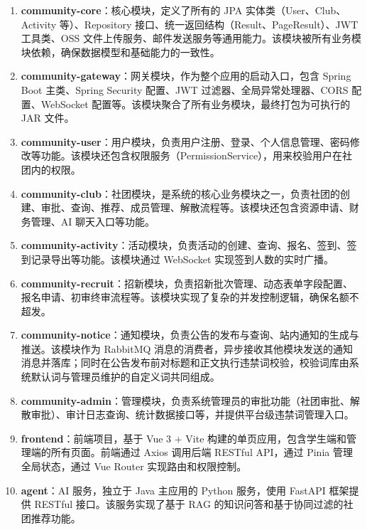\begin{enumerate}
  \item \textbf{community-core}：核心模块，定义了所有的 JPA 实体类（User、Club、Activity 等）、Repository 接口、统一返回结构（Result、PageResult）、JWT 工具类、OSS 文件上传服务、邮件发送服务等通用能力。该模块被所有业务模块依赖，确保数据模型和基础能力的一致性。

  \item \textbf{community-gateway}：网关模块，作为整个应用的启动入口，包含 Spring Boot 主类、Spring Security 配置、JWT 过滤器、全局异常处理器、CORS 配置、WebSocket 配置等。该模块聚合了所有业务模块，最终打包为可执行的 JAR 文件。

  \item \textbf{community-user}：用户模块，负责用户注册、登录、个人信息管理、密码修改等功能。该模块还包含权限服务（PermissionService），用来校验用户在社团内的权限。

  \item \textbf{community-club}：社团模块，是系统的核心业务模块之一，负责社团的创建、审批、查询、推荐、成员管理、解散流程等。该模块还包含资源申请、财务管理、AI 聊天入口等功能。

  \item \textbf{community-activity}：活动模块，负责活动的创建、查询、报名、签到、签到记录导出等功能。该模块通过 WebSocket 实现签到人数的实时广播。

  \item \textbf{community-recruit}：招新模块，负责招新批次管理、动态表单字段配置、报名申请、初审终审流程等。该模块实现了复杂的并发控制逻辑，确保名额不超发。

  \item \textbf{community-notice}：通知模块，负责公告的发布与查询、站内通知的生成与推送。该模块作为 RabbitMQ 消息的消费者，异步接收其他模块发送的通知消息并落库；同时在公告发布前对标题和正文执行违禁词校验，校验词库由系统默认词与管理员维护的自定义词共同组成。

  \item \textbf{community-admin}：管理模块，负责系统管理员的审批功能（社团审批、解散审批）、审计日志查询、统计数据接口等，并提供平台级违禁词管理入口。

  \item \textbf{frontend}：前端项目，基于 Vue 3 + Vite 构建的单页应用，包含学生端和管理端的所有页面。前端通过 Axios 调用后端 RESTful API，通过 Pinia 管理全局状态，通过 Vue Router 实现路由和权限控制。

  \item \textbf{agent}：AI 服务，独立于 Java 主应用的 Python 服务，使用 FastAPI 框架提供 RESTful 接口。该服务实现了基于 RAG 的知识问答和基于协同过滤的社团推荐功能。
\end{enumerate}

